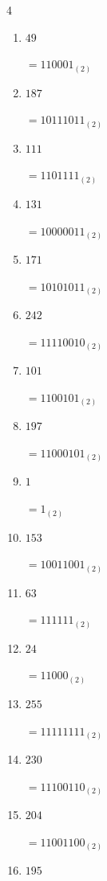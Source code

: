 \begin{multicols}{4}
\begin{enumerate}
        $=100100_{(2)}$

  \item $49$

        $=110001_{(2)}$

  \item $187$

        $=10111011_{(2)}$

  \item $111$

        $=1101111_{(2)}$

\columnbreak %

  \item $131$

        $=10000011_{(2)}$

  \item $171$

        $=10101011_{(2)}$

  \item $242$

        $=11110010_{(2)}$

  \item $101$

        $=1100101_{(2)}$

  \item $197$

        $=11000101_{(2)}$

  \item $1$

        $=1_{(2)}$

  \item $153$

        $=10011001_{(2)}$

  \item $63$

        $=111111_{(2)}$

  \item $24$

        $=11000_{(2)}$

  \item $255$

        $=11111111_{(2)}$

  \item $230$

        $=11100110_{(2)}$

  \item $204$

        $=11001100_{(2)}$

  \item $195$


\end{enumerate}
\end{multicols}
